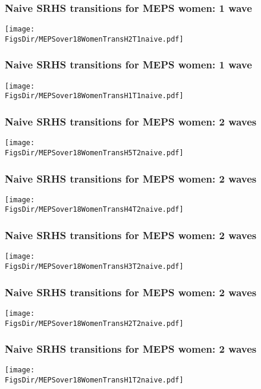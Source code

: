 \documentclass[aspectratio=169]{beamer}
\newcommand{\FigsDir}{../Figures}
\begin{document}
\begin{frame}\frametitle{Naive SRHS transitions for MEPS women: 1 wave}
\begin{center}
\texttt{[image: \\FigsDir/MEPSover18WomenTransH2T1naive.pdf]}
\end{center}
\end{frame}

\begin{frame}\frametitle{Naive SRHS transitions for MEPS women: 1 wave}
\begin{center}
\texttt{[image: \\FigsDir/MEPSover18WomenTransH1T1naive.pdf]}
\end{center}
\end{frame}

\begin{frame}\frametitle{Naive SRHS transitions for MEPS women: 2 waves}
\begin{center}
\texttt{[image: \\FigsDir/MEPSover18WomenTransH5T2naive.pdf]}
\end{center}
\end{frame}

\begin{frame}\frametitle{Naive SRHS transitions for MEPS women: 2 waves}
\begin{center}
\texttt{[image: \\FigsDir/MEPSover18WomenTransH4T2naive.pdf]}
\end{center}
\end{frame}

\begin{frame}\frametitle{Naive SRHS transitions for MEPS women: 2 waves}
\begin{center}
\texttt{[image: \\FigsDir/MEPSover18WomenTransH3T2naive.pdf]}
\end{center}
\end{frame}

\begin{frame}\frametitle{Naive SRHS transitions for MEPS women: 2 waves}
\begin{center}
\texttt{[image: \\FigsDir/MEPSover18WomenTransH2T2naive.pdf]}
\end{center}
\end{frame}

\begin{frame}\frametitle{Naive SRHS transitions for MEPS women: 2 waves}
\begin{center}
\texttt{[image: \\FigsDir/MEPSover18WomenTransH1T2naive.pdf]}
\end{center}
\end{frame}
\end{document}
